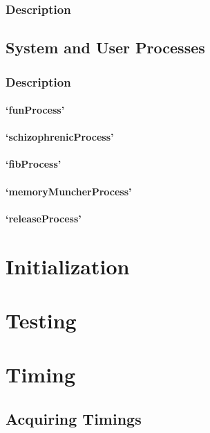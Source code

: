 \documentclass[12pt]{report}
\begin{document}
\section{Description}

\chapter{System and User Processes}

\section{Description}

\subsection{`funProcess'}

\subsection{`schizophrenicProcess'}

\subsection{`fibProcess'}

\subsection{`memoryMuncherProcess'}

\subsection{`releaseProcess'}

\part{Initialization}

\part{Testing}

\part{Timing}

\chapter{Acquiring Timings}
\end{document}
